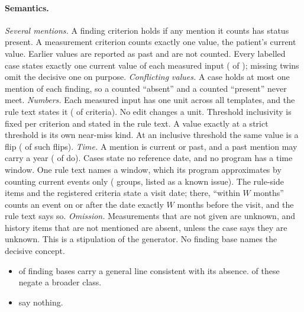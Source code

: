 \paragraph{Semantics.}
\emph{Several mentions.} A finding criterion holds if any mention it counts has status present. A
measurement criterion counts exactly one value, the patient's current value. Earlier values are reported as
past and are not counted. Every labelled case states exactly one current value of each measured input
( of
); missing twins omit the decisive one on
purpose. \emph{Conflicting values.} A case holds at most one mention of each finding, so a counted
``absent'' and a counted ``present'' never meet. \emph{Numbers.} Each measured input has one unit across
all templates, and the rule text states it
( of
 criteria). No edit changes a unit.
Threshold inclusivity is fixed per criterion and stated in the rule text. A value exactly at a strict
threshold is its own near-miss kind. At an inclusive threshold the same value is a flip
( of
 such flips).
\emph{Time.} A mention is current or past, and a past mention may carry a year
( of
 do). Cases state no reference date, and no
program has a time window. One rule text names a window, which its program approximates by counting
current events only (
groups, listed as a known issue). The rule-side items and the registered criteria state a visit date;
there, ``within $W$ months'' counts an event on or after the date exactly $W$ months before the visit,
and the rule text says so. \emph{Omission.} Measurements that are not given are unknown, and history
items that are not mentioned are absent, unless the case says they are unknown. This is a stipulation of
the generator. No finding base names the decisive concept.
\begin{itemize}
\item {} of
 finding bases carry a general line
consistent with its absence. 
of these negate a broader class.
\item {} say nothing.
\end{itemize}
